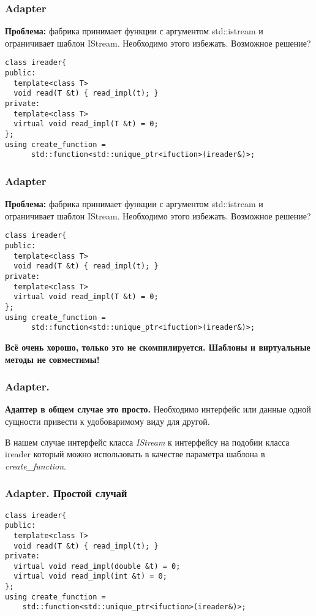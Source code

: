 \begin{frame}[fragile]
  \frametitle{Adapter}
  \textbf{Проблема:} фабрика принимает функции с аргументом std::istream и ограничивает шаблон IStream.
  Необходимо этого избежать. Возможное решение?
  
  \begin{verbatim}
class ireader{
public:
  template<class T>
  void read(T &t) { read_impl(t); }
private:
  template<class T>
  virtual void read_impl(T &t) = 0;
};
using create_function = 
      std::function<std::unique_ptr<ifuction>(ireader&)>;
  \end{verbatim}
\end{frame}

\begin{frame}[fragile]
  \frametitle{Adapter}
  \textbf{Проблема:} фабрика принимает функции с аргументом std::istream и ограничивает шаблон IStream.
  Необходимо этого избежать. Возможное решение?
  
  \begin{verbatim}
class ireader{
public:
  template<class T>
  void read(T &t) { read_impl(t); }
private:
  template<class T>
  virtual void read_impl(T &t) = 0;
};
using create_function = 
      std::function<std::unique_ptr<ifuction>(ireader&)>;
  \end{verbatim}
  \bf{Всё очень хорошо, только это не скомпилируется. Шаблоны и виртуальные методы не совместимы!}
\end{frame}

\begin{frame}[fragile]
  \frametitle{Adapter. }
  \textbf{Адаптер в общем случае это просто.} Необходимо интерфейс или данные одной сущности привести к удобоваримому виду для другой.
  \vspace{10pt}
  
  В нашем случае интерфейс класса \textit{IStream} к интерфейсу на подобии класса ireader который можно использовать в качестве параметра шаблона в \textit{create\_function}.
\end{frame}

\begin{frame}[fragile]
  \frametitle{Adapter. Простой случай}
    \begin{verbatim}
class ireader{
public:
  template<class T>
  void read(T &t) { read_impl(t); }
private:
  virtual void read_impl(double &t) = 0;
  virtual void read_impl(int &t) = 0;
};
using create_function = 
    std::function<std::unique_ptr<ifuction>(ireader&)>;
  \end{verbatim}
\end{frame}

